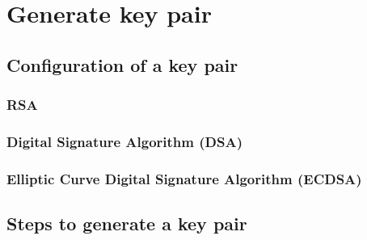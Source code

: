 \chapter{Generate key pair}

\section{Configuration of a key pair}
\subsection{RSA}
\subsection{Digital Signature Algorithm (DSA)}
\subsection{Elliptic Curve Digital Signature Algorithm (ECDSA)}

\section{Steps to generate a key pair}